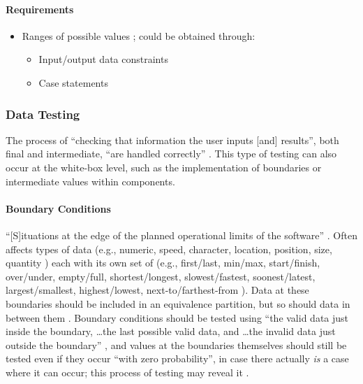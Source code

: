 \paragraph{Requirements}
\begin{itemize}
      \item Ranges of possible values \cite[p.~67]{patton_software_2006};
            could be obtained through:
            \begin{itemize}
                  \item Input/output data constraints
                  \item Case statements
            \end{itemize}
\end{itemize}

\subsubsection{Data Testing \cite[pp.~70-79]{patton_software_2006}}

The process of ``checking that information the user inputs [and] results'',
both final and intermediate, ``are handled correctly''
\cite[p.~70]{patton_software_2006}. This type of testing can also occur at the
white-box level, such as the implementation of boundaries
\cite[p.~431]{van_vliet_software_2000} or intermediate values within
components.

\paragraph{Boundary Conditions \cite[pp.~70-74]{patton_software_2006}}

``[S]ituations at the edge of the planned operational limits of the software''
\cite[p.~72]{patton_software_2006}. Often affects types of data (e.g., numeric,
speed, character, location, position, size, quantity
\cite[p.~72]{patton_software_2006}) each with its own set of (e.g., first/last,
min/max, start/finish, over/under, empty/full, shortest/longest,
slowest/fastest, soonest/latest, largest/smallest, highest/lowest,
next-to/farthest-from \cite[pp.~72-73]{patton_software_2006}). Data at these
boundaries should be included in an equivalence partition, but so should
data in between them \cite[p.~73]{patton_software_2006}. Boundary conditions
should be tested using ``the valid data just inside the boundary,
\dots the last possible valid data, and \dots the invalid data just outside the
boundary'' \cite[p.~73]{patton_software_2006}, and values at the boundaries
themselves should still be tested even if they occur ``with zero probability'',
in case there actually \emph{is} a case where it can occur; this process of
testing may reveal it \cite[p.~460]{peters_software_2000}.

